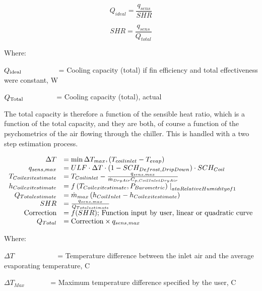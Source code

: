 \begin{equation}
  Q_{ideal} = \frac{q_{sens}}{SHR}
\end{equation}

\begin{equation}
  SHR = \frac{q_{sens}}{Q_{total}}
\end{equation}

Where:

\({Q_{{\rm{ideal}}}}\) ~~~~~~~~~ = Cooling capacity (total) if fin efficiency and total effectiveness were constant, W

\({Q_{{\rm{Total}}}}\) ~~~~~~~~ = Cooling capacity (total), actual

The total capacity is therefore a function of the sensible heat ratio, which is a function of the total capacity, and they are both, of course a function of the psychometrics of the air flowing through the chiller. This is handled with a two step estimation process.

\begin{equation}
  \begin{array}{rl}
                  \Delta T &= \min{ \Delta T_{max},\PB{T_{coil inlet} - T_{evap}}} \\
              q_{sens,max} &= ULF \cdot \Delta T \cdot \PB{1 - SCH_{Defrost,DripDown}} \cdot SCH_{Coil} \\ 
    T_{Coil exit estimate} &= T_{Coil inlet} - \frac{q_{sens,max}}{\dot{m}_{DryAir} C_{p,Coil Inlet Dry Air}} \\
    h_{Coil exit estimate} &= f\PB{T_{Coil exit estimate},P_{Barometric}}\left.\right|_{at a Relative Humidity of 1} \\
        Q_{Total estimate} &= \dot{m}_{max}\PB{h_{Coil Inlet} - h_{Coil exit estimate}} \\
                       SHR &= \frac{q_{sens,max}}{Q_{Total estimate}} \\
         \text{Correction} &= f(SHR);\,\text{Function input by user, linear or quadratic curve} \\
                 Q_{Total} &= \text{Correction} \times q_{sens,max}
  \end{array}
\end{equation}

Where:

\(\Delta T\) ~~~~~~~~~~~ = Temperature difference between the inlet air and the average evaporating temperature, C

\(\Delta T{}_{Max}\) ~~~~~~ = Maximum temperature difference specified by the user, C

